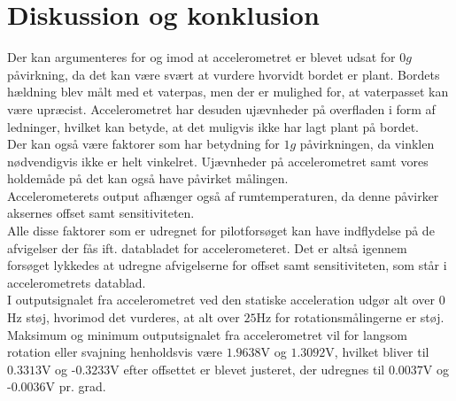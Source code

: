 \section{Diskussion og konklusion}
Der kan argumenteres for og imod at accelerometret er blevet udsat for $0g$ påvirkning, da det kan være svært at vurdere hvorvidt bordet er plant. Bordets hældning blev målt med et vaterpas, men der er mulighed for, at vaterpasset kan være upræcist. Accelerometret har desuden ujævnheder på overfladen i form af ledninger, hvilket kan betyde, at det muligvis ikke har lagt plant på bordet. \\
Der kan også være faktorer som har betydning for $1g$ påvirkningen, da vinklen nødvendigvis ikke er helt vinkelret. Ujævnheder på accelerometret samt vores holdemåde på det kan også have påvirket målingen. \\
Accelerometerets output afhænger også af rumtemperaturen, da denne påvirker aksernes offset samt sensitiviteten.\\ %
Alle disse faktorer som er udregnet for pilotforsøget kan have indflydelse på de afvigelser der fås ift. databladet for accelerometeret. Det er altså igennem forsøget lykkedes at udregne afvigelserne for offset samt sensitiviteten, som står i accelerometrets datablad.  \\

I outputsignalet fra accelerometret ved den statiske acceleration udgør alt over $0$Hz støj, hvorimod det vurderes, at alt over $25$Hz for rotationsmålingerne er støj. Maksimum og minimum outputsignalet fra accelerometret vil for langsom rotation eller svajning henholdsvis være $1.9638$V og $1.3092$V, hvilket bliver til $0.3313$V og -$0.3233$V efter offsettet er blevet justeret, der udregnes til $0.0037$V og -$0.0036$V pr. grad. \\ \clearpage
